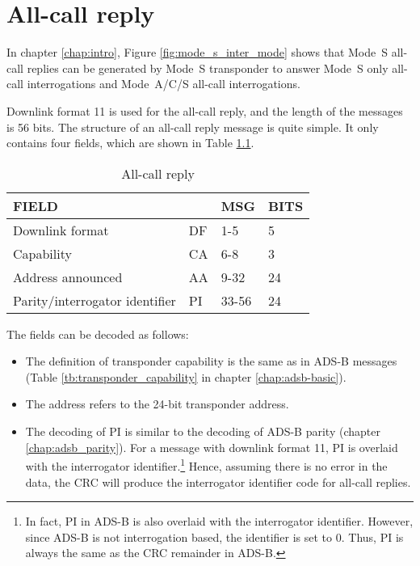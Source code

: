 \chapter{All-call reply}

In chapter \ref{chap:intro}, Figure \ref{fig:mode_s_inter_mode} shows that Mode~S all-call replies can be generated by Mode~S transponder to answer Mode~S only all-call interrogations and Mode~A/C/S all-call interrogations.

Downlink format 11 is used for the all-call reply, and the length of the messages is 56 bits. The structure of an all-call reply message is quite simple. It only contains four fields, which are shown in Table \ref{tb:df11_structure}.

\begin{table}[ht]
\caption{All-call reply}
\label{tb:df11_structure}
\begin{tabular}{|l|l|l|l|}
\hline
\textbf{FIELD} & \textbf{} & \textbf{MSG} & \textbf{BITS} \\ \hline
Downlink format & DF & 1-5 & 5 \\ \hline
Capability & CA & 6-8 & 3 \\ \hline
Address announced & AA & 9-32 & 24 \\ \hline
Parity/interrogator identifier & PI & 33-56 & 24 \\ \hline
\end{tabular}
\end{table}

The fields can be decoded as follows:

\begin{itemize}
  \item The definition of transponder capability is the same as in ADS-B messages (Table \ref{tb:transponder_capability} in chapter \ref{chap:adsb-basic}).

  \item The address refers to the 24-bit transponder address.

  \item The decoding of PI is similar to the decoding of ADS-B parity (chapter \ref{chap:adsb_parity}). For a message with downlink format 11, PI is overlaid with the interrogator identifier.\footnote{In fact, PI in ADS-B is also overlaid with the interrogator identifier. However, since ADS-B is not interrogation based, the identifier is set to 0. Thus, PI is always the same as the CRC remainder in ADS-B.} Hence, assuming there is no error in the data, the CRC will produce the interrogator identifier code for all-call replies.

\end{itemize}


